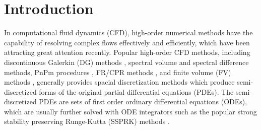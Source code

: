 \documentclass[preprint,12pt]{elsarticle}
\begin{document}
\begin{frontmatter}
    \begin{keyword}



    \end{keyword}

\end{frontmatter}


\section{Introduction}
\label{sec:intro}

In computational fluid dynamics (CFD),
high-order numerical methods have the capability of
resolving complex flows effectively and efficiently,
which have been attracting great attention recently.
Popular high-order CFD methods, including discontinuous
Galerkin (DG) methods
\cite{reed1973triangularDG,
    BASSI1997251DG,
    BASSI1997267DG,
    cockburn1989DGII,
    cockburn2001rungeDG},
spectral volume
\cite{WANG2002210_SV}
and spectral difference
\cite{LIU2006780_SD} methods,
PnPm procedures
\cite{DUMBSER20088209_PNPM},
FR/CPR methods
\cite{huynh2007flux_FR,
    huynh2009reconstruction_FR,
    vincent2011new_FR,
    wang2009unifying_CPR},
and finite volume (FV) methods
\cite{wang2016compact_VR,
    wang2016compact1_VR,
    wang2017compact_VR,
    pan2018high_VR,
    zhang2019compact_VR,
    barth1990higher_FV,
    delanaye1999quadratic_FV,
    ollivier1997quasi_ENO,
    friedrich1998weighted_WENO,
    hu1999weighted_WENO,
    dumbser2007quadrature_WENO},
generally provides spacial discretization methods
which produce semi-discretized forms of the original
partial differential equations (PDEs).
The semi-discretized PDEs are
sets of first order ordinary
differential equations (ODEs),
which are usually further solved with
ODE integrators such as the
popular strong stability preserving
Runge-Kutta (SSPRK) methods
\cite{gottlieb2001strong_SSPRK}.
\end{document}
